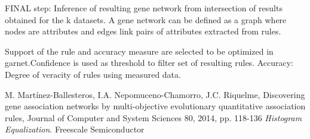 \documentclass[12pt,spanish]{article}
\begin{document}
FINAL step: Inference of resulting gene network from intersection of results obtained for the k datasets. A gene network can be defined as a graph where nodes are attributes and edges link pairs of attributes extracted from rules.

Support of the rule and accuracy measure are selected to be optimized in garnet.Confidence is used as threshold to filter set of resulting rules. 
Accuracy: Degree of veracity of rules using measured data.

\begin{thebibliography}{9}

	M. Martínez-Ballesteros, I.A. Nepomuceno-Chamorro, J.C. Riquelme,
	Discovering gene association networks by multi-objective evolutionary quantitative association rules,
	Journal of Computer and System Sciences 80, 2014,
	pp. 118-136
	\emph{Histogram Equalization}.
	Freescale Semiconductor

\end{thebibliography}
\end{document}
